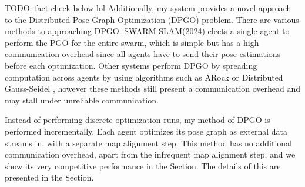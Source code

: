 TODO: fact check below lol
Additionally, my system provides a novel approach to the Distributed Pose Graph Optimization (DPGO) problem. There are various methods to approaching DPGO. SWARM-SLAM(2024) \autocite{Lajoie_2024} elects a single agent to perform the PGO for the entire swarm, which is simple but has a high communication overhead since all agents have to send their pose estimations before each optimization. Other systems perform DPGO by spreading computation across agents by using algorithms such as ARock \autocite{Peng_2016} or Distributed Gauss-Seidel \autocite{DBLP:journals/corr/ChoudharyCNRCD17}, however these methods still present a communication overhead and may stall under unreliable communication.

Instead of performing discrete optimization runs, my method of DPGO is performed incrementally. Each agent optimizes its pose graph as external data streams in, with a separate map alignment step. This method has no additional communication overhead, apart from the infrequent map alignment step, and we show its very competitive performance in the  Section. The details of this are presented in the  Section.









